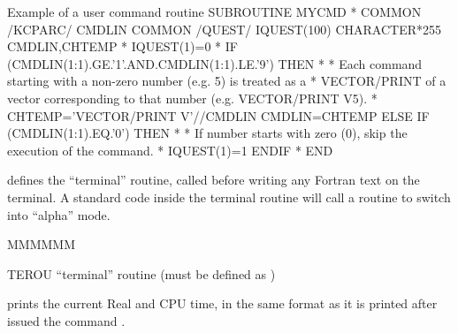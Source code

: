 \begin{XMPt}{Example of a user command routine}
      SUBROUTINE MYCMD
*
      COMMON /KCPARC/ CMDLIN
      COMMON /QUEST/ IQUEST(100)
      CHARACTER*255 CMDLIN,CHTEMP
*      
      IQUEST(1)=0
*
      IF (CMDLIN(1:1).GE.'1'.AND.CMDLIN(1:1).LE.'9') THEN
*
*  Each command starting with a non-zero number (e.g. 5) is treated  as a
*  VECTOR/PRINT of a vector corresponding to that number (e.g. VECTOR/PRINT V5).
*
        CHTEMP='VECTOR/PRINT V'//CMDLIN
        CMDLIN=CHTEMP
      ELSE IF (CMDLIN(1:1).EQ.'0') THEN
*
*  If number starts with zero (0), skip the execution of the command.
*
        IQUEST(1)=1
      ENDIF
*
      END
\end{XMPt}


\Action defines the ``terminal'' routine, called before writing any
Fortran text on the terminal. A standard code inside the
terminal routine will call a routine to switch into ``alpha'' mode. 
\Pdesc\begin{DLtt}{MMMMMM}
\item[TEROU] ``terminal'' routine (must be defined as )
\end{DLtt}

\Action prints the current Real and CPU time, in the same format as it is
printed after issued the command .

